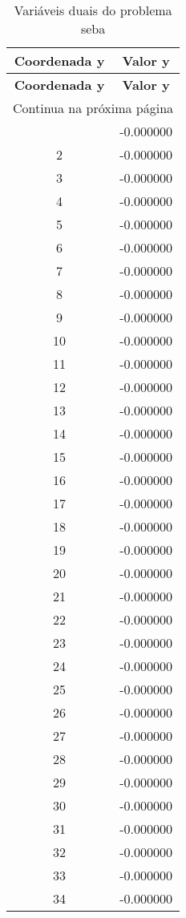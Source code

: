 \documentclass[12pt]{article}
\begin{document}
\begin{longtable}{@{}cc@{}}
\caption{Variáveis duais do problema seba} \\
\toprule
\textbf{Coordenada y} & \textbf{Valor y} \\
\midrule
\endfirsthead

\toprule
\textbf{Coordenada y} & \textbf{Valor y} \\
\midrule
\endhead

\midrule \multicolumn{2}{r}{{Continua na próxima página}} \\ \midrule
\endfoot

\bottomrule
\endlastfoot
1 & -0.000000 \\
2 & -0.000000 \\
3 & -0.000000 \\
4 & -0.000000 \\
5 & -0.000000 \\
6 & -0.000000 \\
7 & -0.000000 \\
8 & -0.000000 \\
9 & -0.000000 \\
10 & -0.000000 \\
11 & -0.000000 \\
12 & -0.000000 \\
13 & -0.000000 \\
14 & -0.000000 \\
15 & -0.000000 \\
16 & -0.000000 \\
17 & -0.000000 \\
18 & -0.000000 \\
19 & -0.000000 \\
20 & -0.000000 \\
21 & -0.000000 \\
22 & -0.000000 \\
23 & -0.000000 \\
24 & -0.000000 \\
25 & -0.000000 \\
26 & -0.000000 \\
27 & -0.000000 \\
28 & -0.000000 \\
29 & -0.000000 \\
30 & -0.000000 \\
31 & -0.000000 \\
32 & -0.000000 \\
33 & -0.000000 \\
34 & -0.000000 \\

\end{longtable}
\end{document}

